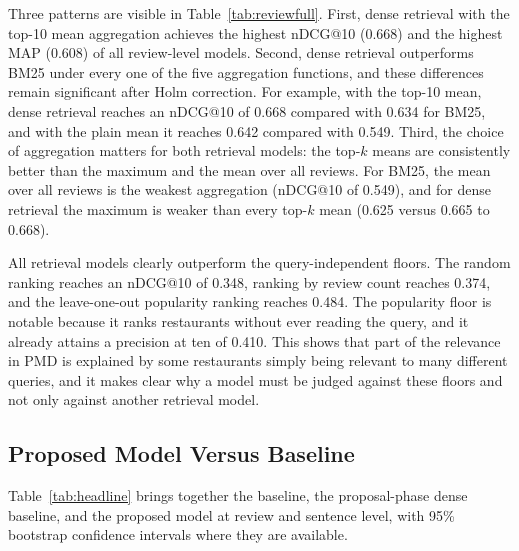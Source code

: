 Three patterns are visible in Table~\ref{tab:reviewfull}. First, dense retrieval with the top-10 mean aggregation achieves the highest nDCG@10 (0.668) and the highest MAP (0.608) of all review-level models. Second, dense retrieval outperforms BM25 under every one of the five aggregation functions, and these differences remain significant after Holm correction. For example, with the top-10 mean, dense retrieval reaches an nDCG@10 of 0.668 compared with 0.634 for BM25, and with the plain mean it reaches 0.642 compared with 0.549. Third, the choice of aggregation matters for both retrieval models: the top-$k$ means are consistently better than the maximum and the mean over all reviews. For BM25, the mean over all reviews is the weakest aggregation (nDCG@10 of 0.549), and for dense retrieval the maximum is weaker than every top-$k$ mean (0.625 versus 0.665 to 0.668).

All retrieval models clearly outperform the query-independent floors. The random ranking reaches an nDCG@10 of 0.348, ranking by review count reaches 0.374, and the leave-one-out popularity ranking reaches 0.484. The popularity floor is notable because it ranks restaurants without ever reading the query, and it already attains a precision at ten of 0.410. This shows that part of the relevance in PMD is explained by some restaurants simply being relevant to many different queries, and it makes clear why a model must be judged against these floors and not only against another retrieval model.

\subsection{Proposed Model Versus Baseline}
\label{sec:resheadline}

Table~\ref{tab:headline} brings together the baseline, the proposal-phase dense baseline, and the proposed model at review and sentence level, with 95\% bootstrap confidence intervals where they are available.

